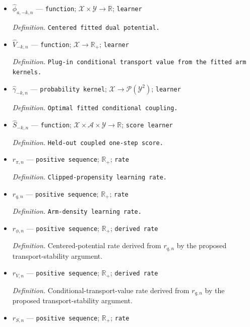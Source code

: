 \documentclass{article}
\begin{document}
\begin{itemize}
  \par\smallskip\noindent\emph{Definition.} \texttt{Fitted conditional quadratic dual potential.}
  \item \(\widehat\phi_{a,-k,n}\) --- \texttt{function}; \(\mathcal X\times\mathcal Y\to\mathbb R\); \texttt{learner}
  \par\smallskip\noindent\emph{Definition.} \texttt{Centered fitted dual potential.}
  \item \(\widehat V_{-k,n}\) --- \texttt{function}; \(\mathcal X\to\mathbb R_+\); \texttt{learner}
  \par\smallskip\noindent\emph{Definition.} \texttt{Plug-\allowbreak{}in conditional transport value from the fitted arm kernels.}
  \item \(\widehat\gamma_{-k,n}\) --- \texttt{probability kernel}; \(\mathcal X\to\mathcal P(\mathcal Y^2)\); \texttt{learner}
  \par\smallskip\noindent\emph{Definition.} \texttt{Optimal fitted conditional coupling.}
  \item \(\widehat S_{-k,n}\) --- \texttt{function}; \(\mathcal X\times\mathcal A\times\mathcal Y\to\mathbb R\); \texttt{score learner}
  \par\smallskip\noindent\emph{Definition.} \texttt{Held-\allowbreak{}out coupled one-\allowbreak{}step score.}
  \item \(r_{\pi,n}\) --- \texttt{positive sequence}; \(\mathbb R_+\); \texttt{rate}
  \par\smallskip\noindent\emph{Definition.} \texttt{Clipped-\allowbreak{}propensity learning rate.}
  \item \(r_{q,n}\) --- \texttt{positive sequence}; \(\mathbb R_+\); \texttt{rate}
  \par\smallskip\noindent\emph{Definition.} \texttt{Arm-\allowbreak{}density learning rate.}
  \item \(r_{\phi,n}\) --- \texttt{positive sequence}; \(\mathbb R_+\); \texttt{derived rate}
  \par\smallskip\noindent\emph{Definition.} Centered-potential rate derived from \(r_{q,n}\) by the proposed transport-stability argument.
  \item \(r_{V,n}\) --- \texttt{positive sequence}; \(\mathbb R_+\); \texttt{derived rate}
  \par\smallskip\noindent\emph{Definition.} Conditional-transport-value rate derived from \(r_{q,n}\) by the proposed transport-stability argument.
  \item \(r_{S,n}\) --- \texttt{positive sequence}; \(\mathbb R_+\); \texttt{rate}

\end{itemize}
\end{document}
